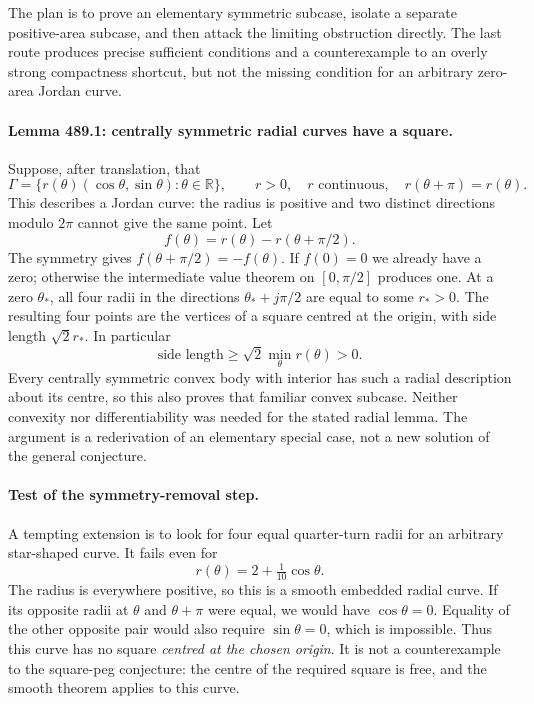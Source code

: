 \documentclass[11pt]{article}
\begin{document}
The plan is to prove an elementary symmetric subcase, isolate a separate
positive-area subcase, and then attack the limiting obstruction directly.
The last route produces precise sufficient conditions and a counterexample
to an overly strong compactness shortcut, but not the missing condition
for an arbitrary zero-area Jordan curve.

\paragraph{Lemma 489.1: centrally symmetric radial curves have a square.}
Suppose, after translation, that
\[
 \Gamma=\{r(\theta)(\cos\theta,\sin\theta):\theta\in\mathbb R\},
 \qquad r>0,\quad r\text{ continuous},\quad
 r(\theta+\pi)=r(\theta).
\]
This describes a Jordan curve: the radius is positive and two distinct
directions modulo $2\pi$ cannot give the same point. Let
\[
                      f(\theta)=r(\theta)-r(\theta+\pi/2).
\]
The symmetry gives $f(\theta+\pi/2)=-f(\theta)$. If $f(0)=0$ we
already have a zero; otherwise the intermediate value theorem on
$[0,\pi/2]$ produces one. At a zero $\theta_*$, all four radii in
the directions $\theta_*+j\pi/2$ are equal to some $r_*>0$.
The resulting four points are the vertices of a square centred at the
origin, with side length $\sqrt2 r_*$. In particular
\begin{equation}\label{a489:radiallower}
                    \text{side length}\ge\sqrt2\min_\theta r(\theta)>0.
\end{equation}
Every centrally symmetric convex body with interior has such a radial
description about its centre, so this also proves that familiar convex
subcase. Neither convexity nor differentiability was needed for the stated
radial lemma. The argument is a rederivation of an elementary special case,
not a new solution of the general conjecture.

\paragraph{Test of the symmetry-removal step.}
A tempting extension is to look for four equal quarter-turn radii for an
arbitrary star-shaped curve. It fails even for
\begin{equation}\label{a489:asymmetric}
                         r(\theta)=2+\tfrac1{10}\cos\theta.
\end{equation}
The radius is everywhere positive, so this is a smooth embedded radial
curve. If its opposite radii at $\theta$ and $\theta+\pi$ were equal,
we would have $\cos\theta=0$. Equality of the other opposite pair would
also require $\sin\theta=0$, which is impossible. Thus this curve has
no square \emph{centred at the chosen origin}. It is not a counterexample
to the square-peg conjecture: the centre of the required square is free,
and the smooth theorem applies to this curve.
\end{document}
